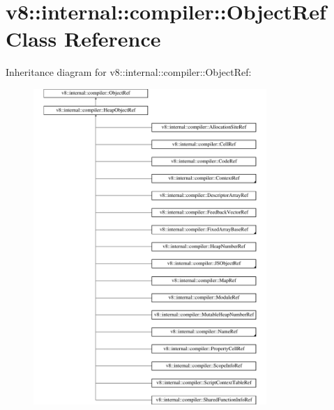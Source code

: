 \hypertarget{classv8_1_1internal_1_1compiler_1_1ObjectRef}{}\section{v8\+:\+:internal\+:\+:compiler\+:\+:Object\+Ref Class Reference}
\label{classv8_1_1internal_1_1compiler_1_1ObjectRef}
Inheritance diagram for v8\+:\+:internal\+:\+:compiler\+:\+:Object\+Ref\+:\begin{figure}[H]
\begin{center}
\leavevmode
\includegraphics[height=12.000000cm]{classv8_1_1internal_1_1compiler_1_1ObjectRef}
\end{center}
\end{figure}
